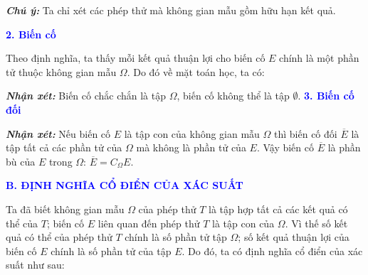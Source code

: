 \documentclass[12pt,a4paper]{extarticle}
\begin{document}
\vspace{0.2cm}
\noindent \textbf{\textit{Chú ý:}} Ta chỉ xét các phép thử mà không gian mẫu gồm hữu hạn kết quả.

\vspace{0.5cm}
\noindent \textbf{\textcolor{blue}{2. Biến cố}}

\noindent Theo định nghĩa, ta thấy mỗi kết quả thuận lợi cho biến cố $E$ chính là một phần tử thuộc không gian mẫu $\Omega$. Do đó về mặt toán học, ta có:

\vspace{0.1cm}
\noindent{}

\vspace{0.2cm}
\noindent \textbf{\textit{Nhận xét:}} Biến cố chắc chắn là tập $\Omega$, biến cố không thể là tập $\emptyset$.
\noindent \textbf{\textcolor{blue}{3. Biến cố đối}}

\vspace{0.1cm}
\noindent{}

\vspace{0.2cm}
\noindent \textbf{\textit{Nhận xét:}} Nếu biến cố $E$ là tập con của không gian mẫu $\Omega$ thì biến cố đối $\overline{E}$ là tập tất cả các phần tử của $\Omega$ mà không là phần tử của $E$. Vậy biến cố $\overline{E}$ là phần bù của $E$ trong $\Omega$: $\overline{E} = C_\Omega E$.

\vspace{0.2cm}


\vspace{0.5cm}
\noindent \textbf{\textcolor{blue}{\large B. ĐỊNH NGHĨA CỔ ĐIỂN CỦA XÁC SUẤT}}

\noindent Ta đã biết không gian mẫu $\Omega$ của phép thử $T$ là tập hợp tất cả các kết quả có thể của $T$; biến cố $E$ liên quan đến phép thử $T$ là tập con của $\Omega$. Vì thế số kết quả có thể của phép thử $T$ chính là số phần tử tập $\Omega$; số kết quả thuận lợi của biến cố $E$ chính là số phần tử của tập $E$. Do đó, ta có định nghĩa cổ điển của xác suất như sau:
\end{document}

